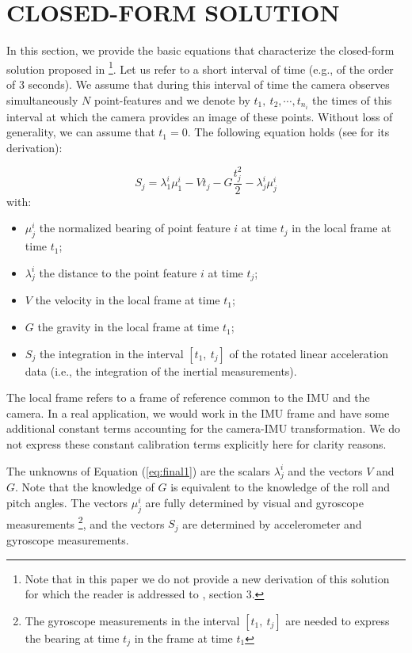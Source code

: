 \documentclass[letterpaper, 10 pt, journal, twoside]{IEEEtran}  %
\begin{document}
\section{CLOSED-FORM SOLUTION}\label{SectionCFS}

In this section, we provide the basic equations that characterize the closed-form solution proposed in \cite{Martinelli2014}\footnote{Note that in this paper we do not provide a new derivation of this solution for which the reader is addressed to \cite{Martinelli2014}, section 3.}.
Let us refer to a short interval of time (e.g., of the order of $3$ seconds). We assume that during this interval of time the camera observes simultaneously $N$ point-features and we denote by $t_1,~t_2,\cdots,t_{n_i}$ the times of this interval at which the camera provides an image of these points. Without loss of generality, we can assume that $t_1=0$.
The following equation holds (see \cite{Martinelli2014} for its derivation):


\begin{equation} \label{eq:final1}
S_j = \lambda_1^i\mu_1^i - V t_j - G \frac{t_j^2}{2} - \lambda^i_j \mu^i_j
\end{equation}
\noindent with:
\begin{itemize}
\item $\mu_j^i$ the normalized bearing of point feature $i$ at time $t_j$ in the local frame at time $t_1$;
\item $\lambda_j^i$ the distance to the point feature $i$ at time $t_j$;
\item $V$ the velocity in the local frame at time $t_1$;
\item $G$ the gravity in the local frame  at time $t_1$;
\item $S_j$ the integration in the interval $[t_1, ~t_j]$ of the rotated linear acceleration data (i.e., the integration of the inertial measurements).
\end{itemize}


The local frame refers to a frame of reference common to the IMU and the camera.
In a real application, we would work in the IMU frame and have some additional constant terms
accounting for the camera-IMU transformation.
We do not express these constant calibration terms explicitly here for clarity reasons.

The unknowns of Equation (\ref{eq:final1}) are the scalars $\lambda_j^i$ and the vectors $V$ and $G$.
Note that the knowledge of $G$ is equivalent to the knowledge of the roll and pitch angles.
The vectors $\mu_j^i$ are fully determined by visual and gyroscope measurements \footnote{The gyroscope measurements in the interval $[t_1, ~t_j]$ are needed to express the bearing at time $t_j$ in the frame at time $t_1$},
and the vectors $S_j$ are determined by accelerometer and gyroscope measurements.
\end{document}
